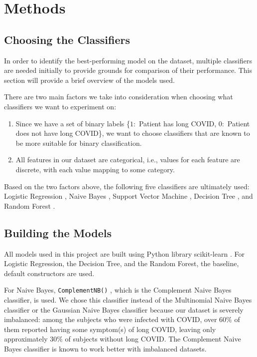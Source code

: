 \documentclass{article}
\begin{document}
\section{Methods}
\label{methods}

\subsection{Choosing the Classifiers}
In order to identify the best-performing model on the dataset, multiple classifiers are needed initially to provide grounds for comparison of their performance.
This section will provide a brief overview of the models used.

There are two main factors we take into consideration when choosing what classifiers we want to experiment on:
\begin{enumerate}[noitemsep]
    \item Since we have a set of binary labels \{$1:$ Patient has long COVID, $0:$ Patient does not have long COVID\}, we want to choose classifiers that are known to be more suitable for binary classification.
    \vspace{0.5em}
    \item All features in our dataset are categorical, i.e., values for each feature are discrete, with each value mapping to some category.
\end{enumerate}
Based on the two factors above, the following five classifiers are ultimately used: Logistic Regression \citep{10.2307/352104}, Naive Bayes \citep{10.2307/1403452}, Support Vector Machine \citep{Cortes1995}, Decision Tree \citep{Quinlan1986}, and Random Forest \citep{Breiman2001}.

\subsection{Building the Models}
All models used in this project are built using Python library scikit-learn \citep{scikit-learn}. 
For Logistic Regression, the Decision Tree, and the Random Forest, the baseline, default constructors are used.

For Naive Bayes, \texttt{ComplementNB()} , which is the Complement Naive Bayes classifier, is used. We chose this classifier instead of the Multinomial Naive Bayes classifier or the Gaussian Naive Bayes classifier because our dataset is severely imbalanced: among the subjects who were infected with COVID, over $60\%$ of them reported having some symptom(s) of long COVID, leaving only approximately $30\%$ of subjects without long COVID. The Complement Naive Bayes classifier is known to work better with imbalanced datasets.
\end{document}
